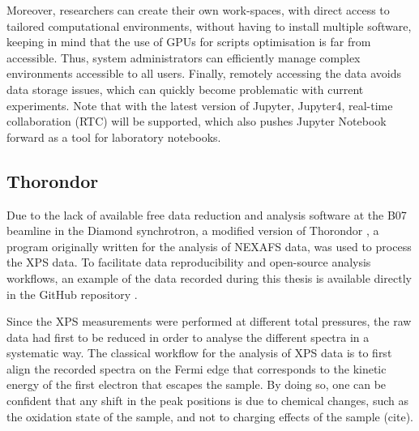 Moreover, researchers can create their own work-spaces, with direct access to tailored computational environments, without having to install multiple software, keeping in mind that the use of GPUs for scripts optimisation is far from accessible.
Thus, system administrators can efficiently manage complex environments accessible to all users.
Finally, remotely accessing the data avoids data storage issues, which can quickly become problematic with current experiments.
Note that with the latest version of Jupyter, Jupyter4, real-time collaboration (RTC) will be supported, which also pushes Jupyter Notebook forward as a tool for laboratory notebooks.


\subsection{Thorondor} \label{sec:Thorondor}

Due to the lack of available free data reduction and analysis software at the B07 beamline in the Diamond synchrotron, a modified version \parencite{Simonne_Thorondor_2022_Diamond} of Thorondor \parencite{Simonne2020}, a program originally written for the analysis of NEXAFS data, was used to process the XPS data.
To facilitate data reproducibility and open-source analysis workflows, an example of the data recorded during this thesis is available directly in the GitHub repository \cite{Simonne_Thorondor_2022_Diamond}.

Since the XPS measurements were performed at different total pressures, the raw data had first to be reduced in order to analyse the different spectra in a systematic way.
The classical workflow for the analysis of XPS data is to first align the recorded spectra on the Fermi edge that corresponds to the kinetic energy of the first electron that escapes the sample.
By doing so, one can be confident that any shift in the peak positions is due to chemical changes, such as the oxidation state of the sample, and not to charging effects of the sample (cite).

